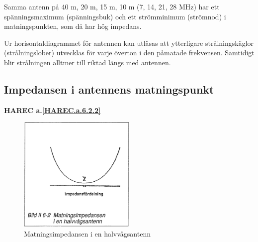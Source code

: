 Samma antenn på 40 m, 20 m, 15 m, 10 m (7, 14, 21, 28 MHz) har ett
spänningsmaximum (spänningsbuk) och ett strömminimum (strömnod) i
matningspunkten, som då har hög impedans.

Ur horisontaldiagrammet för antennen kan utläsas att ytterligare
strålningskäglor (strålningslober) utvecklas för varje överton i den
påmatade frekvensen. Samtidigt blir strålningen alltmer till riktad
längs med antennen.

\subsection{Impedansen i antennens matningspunkt}
\textbf{
HAREC a.\ref{HAREC.a.6.2.2}\label{myHAREC.a.6.2.2}
}

\begin{figure}
  \includegraphics[width=0.5\textwidth]{images/bild_2_6-02}
  \caption{Matningsimpedansen i en halvvågsantenn}
  \label{fig:bildII6-2}
\end{figure}


